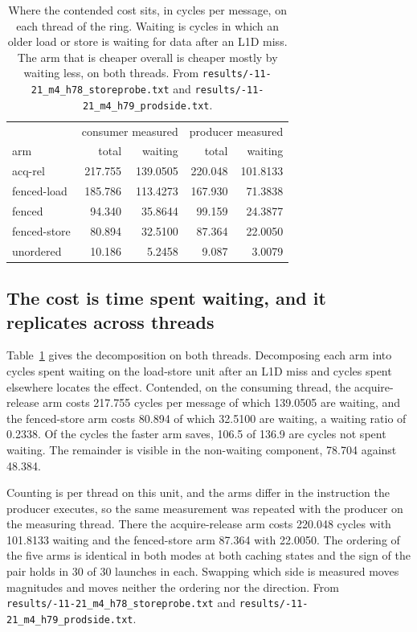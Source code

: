 \documentclass[conference]{IEEEtran}
\begin{document}
\begin{table}[t]
\centering
\caption{Where the contended cost sits, in cycles per message, on each thread
of the ring. Waiting is cycles in which an older load or store is waiting for
data after an L1D miss. The arm that is cheaper overall is cheaper mostly by
waiting less, on both threads. From
\texttt{results/-11-21\_\allowbreak m4\_\allowbreak h78\_\allowbreak storeprobe.txt} and
\texttt{results/-11-21\_\allowbreak m4\_\allowbreak h79\_\allowbreak prodside.txt}.}
\label{tab:wait}
\begin{tabular}{lrrrr}
\hline
 & \multicolumn{2}{c}{consumer measured} & \multicolumn{2}{c}{producer measured} \\
arm & total & waiting & total & waiting \\
\hline
acq-rel & 217.755 & 139.0505 & 220.048 & 101.8133 \\
fenced-load & 185.786 & 113.4273 & 167.930 & 71.3838 \\
fenced & 94.340 & 35.8644 & 99.159 & 24.3877 \\
fenced-store & 80.894 & 32.5100 & 87.364 & 22.0050 \\
unordered & 10.186 & 5.2458 & 9.087 & 3.0079 \\
\hline
\end{tabular}
\end{table}

\subsection{The cost is time spent waiting, and it replicates across threads}

Table~\ref{tab:wait} gives the decomposition on both threads. Decomposing each arm into cycles spent waiting on the load-store unit after an
L1D miss and cycles spent elsewhere locates the effect. Contended, on the
consuming thread, the acquire-release arm costs 217.755 cycles per message of
which 139.0505 are waiting, and the fenced-store arm costs 80.894 of which
32.5100 are waiting, a waiting ratio of 0.2338. Of the cycles the faster arm
saves, 106.5 of 136.9 are cycles not spent waiting. The remainder is visible in
the non-waiting component, 78.704 against 48.384.

Counting is per thread on this unit, and the arms differ in the instruction the
producer executes, so the same measurement was repeated with the producer on the
measuring thread. There the acquire-release arm costs 220.048 cycles with
101.8133 waiting and the fenced-store arm 87.364 with 22.0050. The ordering of
the five arms is identical in both modes at both caching states and the sign of
the pair holds in 30 of 30 launches in each. Swapping which side is measured
moves magnitudes and moves neither the ordering nor the direction. From
\texttt{results/-11-21\_\allowbreak m4\_\allowbreak h78\_\allowbreak storeprobe.txt} and
\texttt{results/-11-21\_\allowbreak m4\_\allowbreak h79\_\allowbreak prodside.txt}.
\end{document}
